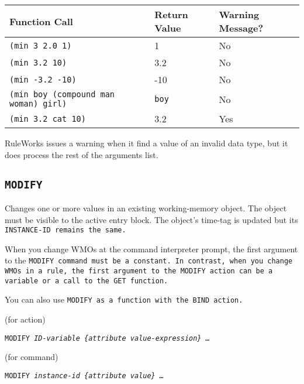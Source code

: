 \begin{center}
\begin{tabular}{lll}
  \toprule
  Function Call & Return Value & Warning Message? \\
  \midrule
  \tt{(min 3 2.0 1)} & 1 & No \\
  \tt{(min 3.2 10)} &  3.2 & No  \\
  \tt{(min -3.2 -10)} &   -10 &   No \\
  \tt{(min boy (compound man woman) girl)} & \tt{boy} & No \\
  \tt{(min 3.2 cat 10)} & 3.2 & Yes \\
  \bottomrule
\end{tabular}
\end{center}

\begin{note}
  RuleWorks issues a warning when it find a value of an invalid data
  type, but it does process the rest of the arguments list.
\end{note}

\subsection{\tt{MODIFY}}

Changes one or more values in an existing working-memory object. The
object must be visible to the active entry block.  The object's
time-tag is updated but its \tt{INSTANCE-ID} remains the same.

\begin{note}
  When you change WMOs at the command interpreter prompt, the first
  argument to the \tt{MODIFY} command must be a constant.  In
  contrast, when you change WMOs in a rule, the first argument to the
  \tt{MODIFY} action can be a variable or a call to the \tt{GET}
  function.
\end{note}

You can also use \tt{MODIFY} as a function with the \tt{BIND} action.

\Format (for action)

\tt{MODIFY} \it{ID-variable} \{\ct\it{attribute} \it{value-expression}\} \ldots

\Format (for command)

\tt{MODIFY} \it{instance-id} \{\ct\it{attribute} \it{value}\} \ldots

